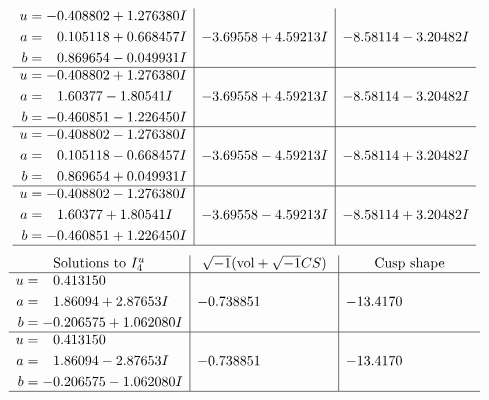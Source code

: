 \documentclass[1p]{elsarticle_modified}
\theoremstyle{definition}
\newcommand{\I}{\sqrt{-1}}
\begin{document}
$$\begin{array}{c|c|c}
\begin{aligned}
u &= -0.408802 + 1.276380 I \\
a &= \phantom{-}0.105118 + 0.668457 I \\
b &= \phantom{-}0.869654 - 0.049931 I\end{aligned}
 & -3.69558 + 4.59213 I & -8.58114 - 3.20482 I \\ \hline\begin{aligned}
u &= -0.408802 + 1.276380 I \\
a &= \phantom{-}1.60377 - 1.80541 I \\
b &= -0.460851 - 1.226450 I\end{aligned}
 & -3.69558 + 4.59213 I & -8.58114 - 3.20482 I \\ \hline\begin{aligned}
u &= -0.408802 - 1.276380 I \\
a &= \phantom{-}0.105118 - 0.668457 I \\
b &= \phantom{-}0.869654 + 0.049931 I\end{aligned}
 & -3.69558 - 4.59213 I & -8.58114 + 3.20482 I \\ \hline\begin{aligned}
u &= -0.408802 - 1.276380 I \\
a &= \phantom{-}1.60377 + 1.80541 I \\
b &= -0.460851 + 1.226450 I\end{aligned}
 & -3.69558 - 4.59213 I & -8.58114 + 3.20482 I\\
 \hline 
 \end{array}$$\newpage$$\begin{array}{c|c|c}  
\text{Solutions to }I^u_{4}& \I (\text{vol} + \sqrt{-1}CS) & \text{Cusp shape}\\
 \hline 
\begin{aligned}
u &= \phantom{-}0.413150\phantom{ +0.000000I} \\
a &= \phantom{-}1.86094 + 2.87653 I \\
b &= -0.206575 + 1.062080 I\end{aligned}
 & -0.738851\phantom{ +0.000000I} & -13.4170\phantom{ +0.000000I} \\ \hline\begin{aligned}
u &= \phantom{-}0.413150\phantom{ +0.000000I} \\
a &= \phantom{-}1.86094 - 2.87653 I \\
b &= -0.206575 - 1.062080 I\end{aligned}
 & -0.738851\phantom{ +0.000000I} & -13.4170\phantom{ +0.000000I}\\
 \hline 
 \end{array}$$\newpage\newpage\renewcommand{\arraystretch}{1}
\end{document}
